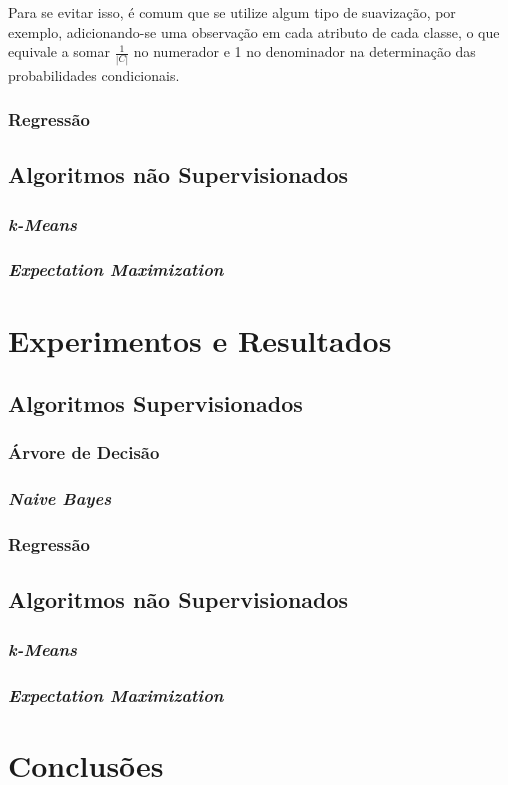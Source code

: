 \documentclass{article}
\begin{document}
Para se evitar isso, é comum que se utilize algum tipo de suavização, por exemplo, adicionando-se uma observação em cada atributo de cada classe, o que equivale a somar $\frac{1}{|C|}$ no numerador e 1 no denominador na determinação das probabilidades condicionais.

\subsubsection{Regressão}

\subsection{Algoritmos não Supervisionados}

\subsubsection{{\b \it k-Means}}

\subsubsection{{\b \it Expectation Maximization}}

\section{Experimentos e Resultados}

\subsection{Algoritmos Supervisionados}

\subsubsection{Árvore de Decisão}

\subsubsection{{\b \it Naive Bayes}}

\subsubsection{Regressão}

\subsection{Algoritmos não Supervisionados}

\subsubsection{{\b \it k-Means}}

\subsubsection{{\b \it Expectation Maximization}}

\section{Conclusões}


\end{document}
